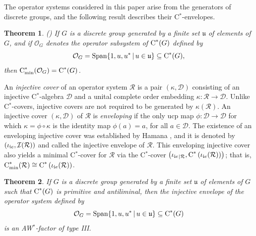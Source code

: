 \documentclass{amsart}
\newtheorem{theorem}{Theorem}[section]
\theoremstyle{definition}
\theoremstyle{remark}
\newcommand\osr{{\mathcal R}}
\newcommand\cstar{{\textrm C}^*}                              %
\newcommand\cstare{{\textrm C}_{\textrm{min}}^*}              %
\numberwithin{equation}{section}
\begin{document}
The operator systems considered in this paper arise from the generators of discrete groups, and the following result describes their C$^*$-envelopes. 

\begin{theorem}\label{cstar-env} {\textrm (\cite{farenick--kavruk--paulsen--todorov2014})}
If $G$ is a discrete group generated by a finite set $\mathfrak u$ of elements of $G$, and if $\mathcal O_G$ denotes the operator subsystem of $\cstar(G)$ 
defined by
\begin{equation}\label{e:og}
\mathcal O_{G}=\mbox{\textrm Span}\{1,u,u^*\,|\,u\in\mathfrak u\}\subseteq \cstar(G),
\end{equation}
then $\cstare(\mathcal O_G)=\cstar(G)$.
\end{theorem}

An \emph{injective cover} of an operator system $\osr$ is a pair $(\kappa, \mathcal D)$ consisting of an injective C$^*$-algebra $\mathcal D$ and a unital
complete order embedding $\kappa:\osr\rightarrow\mathcal D$. Unlike C$^*$-covers, injective covers are not required to be generated by $\kappa(\osr)$.
An injective cover $(\kappa, \mathcal D)$ of $\osr$ is \emph{enveloping} if the only ucp map $\phi:\mathcal D\rightarrow\mathcal D$ for which $\kappa=\phi\circ \kappa$
is the identity map $\phi(a)=a$, for all $a\in\mathcal D$. The existence of an enveloping injective cover was established by Hamana \cite{hamana1979b}, and it is 
denoted by $(\iota_{\textrm ie},\mathcal I(\osr))$ and called the injective envelope of $\osr$. This enveloping injective cover also yields a minimal C$^*$-cover for $\osr$ via
the C$^*$-cover $\left(\iota_{\textrm ie}{}_{\vert\osr},\cstar\left(\iota_{\textrm ie}(\osr)\right)\right)$; that is, $\cstare(\osr)\cong\cstar\left(\iota_{\textrm ie}(\osr)\right)$. 

\begin{theorem}\label{inj-env} 
If $G$ is a discrete group generated by a finite set $\mathfrak u$ of elements of $G$ such that $\cstar(G)$ is primitive and antiliminal, 
then the injective envelope of the operator system 
defined by
\[
\mathcal O_{G}=\mbox{\textrm Span}\{1,u,u^*\,|\,u\in\mathfrak u\}\subseteq \cstar(G)
\]
is an AW$^*$-factor of type III.
\end{theorem}
\end{document}
